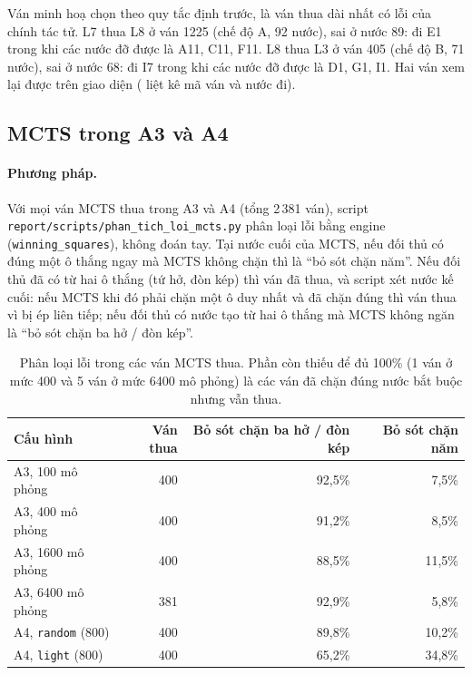 Ván minh hoạ chọn theo quy tắc định trước, là ván thua dài nhất có lỗi của chính tác tử. L7 thua L8 ở ván 1225 (chế độ A, 92 nước), sai ở nước 89: đi E1 trong khi các nước đỡ được là A11, C11, F11. L8 thua L3 ở ván 405 (chế độ B, 71 nước), sai ở nước 68: đi I7 trong khi các nước đỡ được là D1, G1, I1. Hai ván xem lại được trên giao diện ( liệt kê mã ván và nước đi).

\subsection{MCTS trong A3 và A4}
\paragraph{Phương pháp.}
Với mọi ván MCTS thua trong A3 và A4 (tổng 2\,381 ván), script \texttt{report/scripts/phan\_tich\_loi\_mcts.py} phân loại lỗi bằng engine (\texttt{winning\_squares}), không đoán tay. Tại nước cuối của MCTS, nếu đối thủ có đúng một ô thắng ngay mà MCTS không chặn thì là ``bỏ sót chặn năm''. Nếu đối thủ đã có từ hai ô thắng (tứ hở, đòn kép) thì ván đã thua, và script xét nước kế cuối: nếu MCTS khi đó phải chặn một ô duy nhất và đã chặn đúng thì ván thua vì bị ép liên tiếp; nếu đối thủ có nước tạo từ hai ô thắng mà MCTS không ngăn là ``bỏ sót chặn ba hở / đòn kép''.

\begin{table}[H]
  \centering
  \footnotesize
  \begin{tabular}{lrrr}
    \toprule
    \textbf{Cấu hình} & \textbf{Ván thua} & \textbf{Bỏ sót chặn ba hở / đòn kép} & \textbf{Bỏ sót chặn năm} \\
    \midrule
    A3, 100 mô phỏng   & 400 & 92{,}5\% & 7{,}5\% \\
    A3, 400 mô phỏng   & 400 & 91{,}2\% & 8{,}5\% \\
    A3, 1600 mô phỏng  & 400 & 88{,}5\% & 11{,}5\% \\
    A3, 6400 mô phỏng  & 381 & 92{,}9\% & 5{,}8\% \\
    A4, \texttt{random} (800) & 400 & 89{,}8\% & 10{,}2\% \\
    A4, \texttt{light} (800)  & 400 & 65{,}2\% & 34{,}8\% \\
    \bottomrule
  \end{tabular}
  \caption{Phân loại lỗi trong các ván MCTS thua. Phần còn thiếu để đủ 100\% (1 ván ở mức 400 và 5 ván ở mức 6400 mô phỏng) là các ván đã chặn đúng nước bắt buộc nhưng vẫn thua.}
  \label{tab:loi-mcts}
\end{table}

